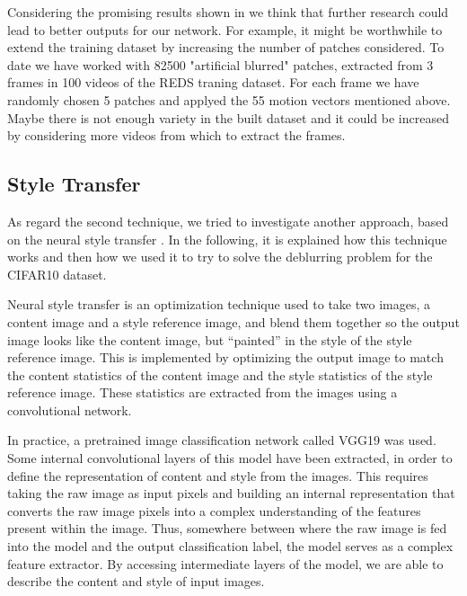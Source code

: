 \documentclass[12pt,a4paper]{report}
\begin{document}
Considering the promising results shown in \cite{S&Al} we think that further research could lead to better outputs for our network. For example, it might be worthwhile to extend the training dataset by increasing the number of patches considered. To date we have worked with 82500 "artificial blurred" patches, extracted from 3 frames in 100 videos of the REDS traning dataset. For each frame we have randomly chosen 5 patches and applyed the 55 motion vectors mentioned above. Maybe there is not enough variety in the built dataset and it could be increased by considering more videos from which to extract the frames. 

\subsection{Style Transfer}
As regard the second technique, we tried to investigate another approach, based on the neural style transfer \cite{G&E&B} \cite{Site}. In the following, it is explained how this technique works and then how we used it to try to solve the deblurring problem for the CIFAR10 dataset.

Neural style transfer is an optimization technique used to take two images, a content image and a style reference image, and blend them together so the output image looks like the content image, but “painted” in the style of the style reference image.
This is implemented by optimizing the output image to match the content statistics of the content image and the style statistics of the style reference image. These statistics are extracted from the images using a convolutional network.

In practice, a pretrained image classification network called VGG19 was used. Some internal convolutional layers of this model have been extracted, in order to define the representation of content and style from the images. This requires taking the raw image as input pixels and building an internal representation that converts the raw image pixels into a complex understanding of the features present within the image. Thus, somewhere between where the raw image is fed into the model and the output classification label, the model serves as a complex feature extractor. By accessing intermediate layers of the model, we are able to describe the content and style of input images.
\end{document}
